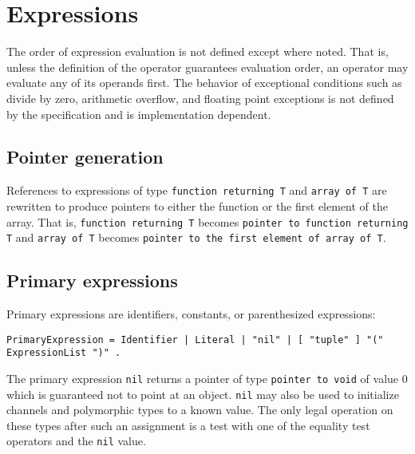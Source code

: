 \hypertarget{expressions}{%
\chapter{Expressions}\label{expressions}}

The order of expression evaluation is not defined except where noted.
That is, unless the definition of the operator guarantees evaluation
order, an operator may evaluate any of its operands first. The behavior
of exceptional conditions such as divide by zero, arithmetic overflow,
and floating point exceptions is not defined by the specification and is
implementation dependent.

\hypertarget{pointer-generation}{%
\section{Pointer generation}\label{pointer-generation}}

References to expressions of type
\passthrough{\lstinline!function returning T!} and
\passthrough{\lstinline!array of T!} are rewritten to produce pointers
to either the function or the first element of the array. That is,
\passthrough{\lstinline!function returning T!} becomes
\passthrough{\lstinline!pointer to function returning T!} and
\passthrough{\lstinline!array of T!} becomes
\passthrough{\lstinline!pointer to the first element of array of T!}.

\hypertarget{primary-expressions}{%
\section{Primary expressions}\label{primary-expressions}}

Primary expressions are identifiers, constants, or parenthesized
expressions:

\begin{lstlisting}
PrimaryExpression = Identifier | Literal | "nil" | [ "tuple" ] "(" ExpressionList ")" .
\end{lstlisting}

The primary expression \passthrough{\lstinline!nil!} returns a pointer
of type \passthrough{\lstinline!pointer to void!} of value 0 which is
guaranteed not to point at an object. \passthrough{\lstinline!nil!} may
also be used to initialize channels and polymorphic types to a known
value. The only legal operation on these types after such an assignment
is a test with one of the equality test operators and the
\passthrough{\lstinline!nil!} value.

